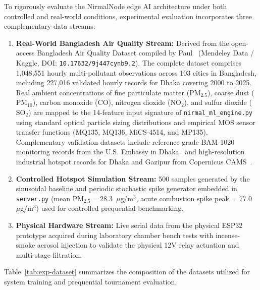 To rigorously evaluate the NirmalNode edge AI architecture under both controlled and real-world conditions, experimental evaluation incorporates three complementary data streams:
\begin{enumerate}
    \item \textbf{Real-World Bangladesh Air Quality Stream:} Derived from the open-access Bangladesh Air Quality Dataset compiled by Paul~\cite{paul2026bangladesh} (Mendeley Data / Kaggle, DOI: \texttt{10.17632/9j447cynb9.2}). The complete dataset comprises 1,048,551 hourly multi-pollutant observations across 103 cities in Bangladesh, including 227,016 validated hourly records for Dhaka covering 2000 to 2025. Real ambient concentrations of fine particulate matter ($\text{PM}_{2.5}$), coarse dust ($\text{PM}_{10}$), carbon monoxide ($\text{CO}$), nitrogen dioxide ($\text{NO}_2$), and sulfur dioxide ($\text{SO}_2$) are mapped to the 14-feature input signature of \texttt{nirmal\_ml\_engine.py} using standard optical particle sizing distributions and empirical MOS sensor transfer functions (MQ135, MQ136, MiCS-4514, and MP135). Complementary validation datasets include reference-grade BAM-1020 monitoring records from the U.S. Embassy in Dhaka~\cite{usembassy2022dhaka} and high-resolution industrial hotspot records for Dhaka and Gazipur from Copernicus CAMS~\cite{cams2024bangladesh}.
    \item \textbf{Controlled Hotspot Simulation Stream:} 500 samples generated by the sinusoidal baseline and periodic stochastic spike generator embedded in \texttt{server.py} (mean $\text{PM}_{2.5} = 28.3$~$\mu$g/m$^3$, acute combustion spike peak = 77.0~$\mu$g/m$^3$) used for controlled prequential benchmarking.
    \item \textbf{Physical Hardware Stream:} Live serial data from the physical ESP32 prototype acquired during laboratory chamber bench tests with incense-smoke aerosol injection to validate the physical 12V relay actuation and multi-stage filtration.
\end{enumerate}

Table~\ref{tab:exp-dataset} summarizes the composition of the datasets utilized for system training and prequential tournament evaluation.

